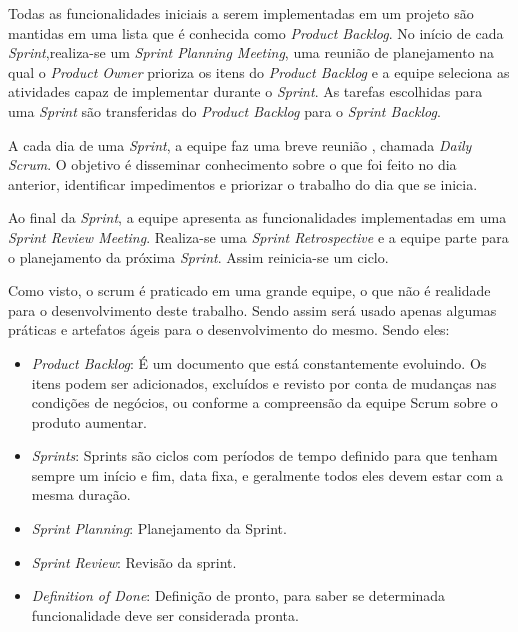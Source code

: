   Todas as funcionalidades iniciais a serem implementadas em um projeto são 
mantidas em uma lista que é conhecida como \textit{Product Backlog}. 
No início de cada	\textit{Sprint},realiza-se um  \textit{	Sprint Planning Meeting}, 
uma reunião de planejamento na qual o \textit{Product Owner} prioriza os itens 
do \textit{Product Backlog} e a equipe seleciona as atividades capaz de 
implementar durante o \textit{Sprint}. As tarefas escolhidas para uma 
\textit{Sprint} são transferidas do \textit{Product Backlog} para o
\textit{Sprint Backlog}.

  A cada dia de uma \textit{Sprint}, a equipe faz uma breve reunião , chamada 
\textit{Daily Scrum}. O objetivo é disseminar conhecimento sobre o que 
foi feito no dia anterior, identificar impedimentos e priorizar o trabalho do 
dia que se inicia.

  Ao final da \textit{Sprint}, a equipe apresenta as funcionalidades implementadas em 
uma \textit{Sprint Review Meeting}. Realiza-se uma \textit{Sprint Retrospective}
 e a equipe parte para o planejamento da próxima \textit{Sprint}. 
Assim reinicia-se um ciclo. 

  Como visto, o scrum é praticado em uma grande equipe, o que não é realidade 
para o desenvolvimento deste trabalho. Sendo assim será usado apenas algumas 
práticas e artefatos ágeis para o desenvolvimento do mesmo. Sendo eles:

  \begin{itemize}                                                               
  \item \textit{Product Backlog}: É um documento que está constantemente evoluindo.
  Os itens podem ser adicionados, excluídos e revisto por conta de mudanças nas 
  condições de negócios, ou conforme a compreensão da equipe Scrum sobre o produto
   aumentar.                                                                    
  \cite{mindmasterScrum}                                                        
  \item \textit{Sprints}: Sprints são ciclos com períodos de tempo definido  para
   que tenham sempre um início e fim, data fixa, e geralmente todos eles devem 
   estar com a mesma duração.                                                   
  \cite{mindmasterScrum}                                                        
  \item \textit{Sprint Planning}: Planejamento da Sprint.                       
  \item \textit{Sprint Review}: Revisão da sprint.                              
  \item \textit{Definition of Done}: Definição de pronto, para saber se determinada
  funcionalidade deve ser considerada pronta.                                   
  \cite{mindmasterScrum}                                                        
  \end{itemize}

